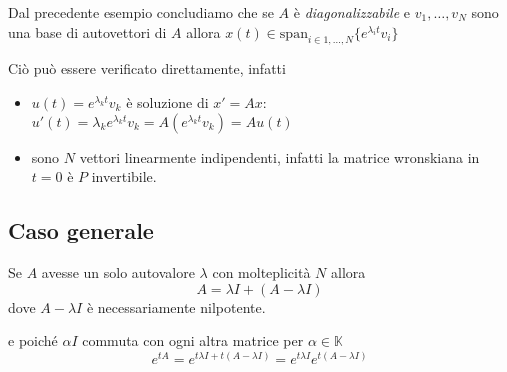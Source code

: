 Dal precedente esempio concludiamo che se \(A\) è \emph{diagonalizzabile} e
\(v_{1}, \dots, v_{N}\) sono una base di autovettori di \(A\) allora \(x{(t)}
\in \mathrm{span}_{i \in 1, \dots, N} \{e^{\lambda_{i}t}v_{i}\} \) 
\begin{remark}
    Ciò può essere verificato direttamente, infatti
\begin{itemize}[label = --]
    \item \(u{(t)} = e^{\lambda_{k}t} v_{k}\) è soluzione di \(x' = Ax\):
        \(u'{(t)} = \lambda_{k}e^{\lambda_{k}t}v_{k} = A(e^{\lambda_{k}t}v_{k})
        = Au{(t)}\) 
    \item sono \(N\) vettori linearmente indipendenti, infatti la matrice
        wronskiana in \(t= 0\) è \(P\) invertibile.
\end{itemize}

\subsection{Caso generale}
Se \(A\) avesse un solo autovalore \(\lambda\) con molteplicità \(N\) allora
\[
  A = \lambda I + (A - \lambda I )
\]
dove \(A - \lambda I\) è necessariamente nilpotente.

e poiché \(\alpha I\) commuta con ogni altra matrice per \(\alpha \in \mathbb{K}\) 
\[
    e^{tA} = e^{t \lambda I + t{(A- \lambda I)}} = e^{t\lambda I}e^{t(A-\lambda
    I)}
\]
\end{remark}




